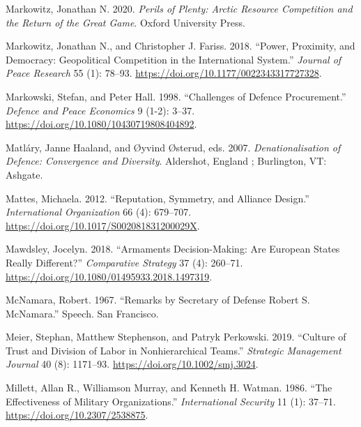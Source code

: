 \documentclass[
  12,
  letterpaper,
  DIV=11,
  numbers=noendperiod]{scrartcl}
\newlength{\cslhangindent}
\newlength{\cslentryspacingunit} %
\newenvironment{CSLReferences}[2] %
 {%
  \setlength{\parindent}{0pt}
  \ifodd #1
  \let\oldpar\par
  \def\par{\hangindent=\cslhangindent\oldpar}
  \fi
  \setlength{\parskip}{#2\cslentryspacingunit}
 }%
 {}
\begin{document}
\begin{CSLReferences}{1}{0}
\leavevmode{}%
Markowitz, Jonathan N. 2020. \emph{Perils of {Plenty}: {Arctic Resource
Competition} and the {Return} of the {Great Game}}. {Oxford University
Press}.

\leavevmode{}%
Markowitz, Jonathan N., and Christopher J. Fariss. 2018. {``Power,
Proximity, and Democracy: {Geopolitical} Competition in the
International System.''} \emph{Journal of Peace Research} 55 (1):
78--93. \url{https://doi.org/10.1177/0022343317727328}.

\leavevmode{}%
Markowski, Stefan, and Peter Hall. 1998. {``Challenges of Defence
Procurement.''} \emph{Defence and Peace Economics} 9 (1-2): 3--37.
\url{https://doi.org/10.1080/10430719808404892}.

\leavevmode{}%
Matláry, Janne Haaland, and Øyvind Østerud, eds. 2007.
\emph{Denationalisation of Defence: Convergence and Diversity}.
{Aldershot, England ; Burlington, VT}: {Ashgate}.

\leavevmode{}%
Mattes, Michaela. 2012. {``Reputation, {Symmetry}, and {Alliance
Design}.''} \emph{International Organization} 66 (4): 679--707.
\url{https://doi.org/10.1017/S002081831200029X}.

\leavevmode{}%
Mawdsley, Jocelyn. 2018. {``Armaments Decision-Making: {Are European}
States Really Different?''} \emph{Comparative Strategy} 37 (4): 260--71.
\url{https://doi.org/10.1080/01495933.2018.1497319}.

\leavevmode{}%
McNamara, Robert. 1967. {``Remarks by {Secretary} of {Defense Robert S}.
{McNamara}.''} Speech. {San Francisco}.

\leavevmode{}%
Meier, Stephan, Matthew Stephenson, and Patryk Perkowski. 2019.
{``Culture of Trust and Division of Labor in Nonhierarchical Teams.''}
\emph{Strategic Management Journal} 40 (8): 1171--93.
\url{https://doi.org/10.1002/smj.3024}.

\leavevmode{}%
Millett, Allan R., Williamson Murray, and Kenneth H. Watman. 1986.
{``The {Effectiveness} of {Military Organizations}.''}
\emph{International Security} 11 (1): 37--71.
\url{https://doi.org/10.2307/2538875}.


\end{CSLReferences}
\end{document}

